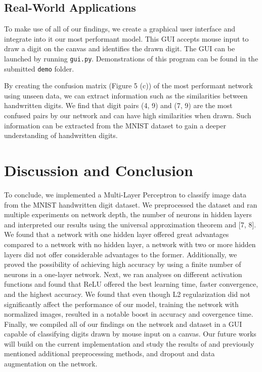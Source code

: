 \documentclass[10pt]{article}
\begin{document}
\subsection{Real-World Applications}

To make use of all of our findings, we create a graphical user interface and integrate into it our most performant model. This GUI accepts mouse input to draw a digit on the canvas and identifies the drawn digit. The GUI can be launched by running \verb+gui.py+. Demonstrations of this program can be found in the submitted \verb+demo+ folder.

By creating the confusion matrix (Figure 5 (c)) of the most performant network using unseen data, we can extract information such as the similarities between handwritten digits. We find that digit pairs (4, 9) and (7, 9) are the most confused pairs by our network and can have high similarities when drawn. Such information can be extracted from the MNIST dataset to gain a deeper understanding of handwritten digits.

\section{Discussion and Conclusion}
To conclude, we implemented a Multi-Layer Perceptron to classify image data from the MNIST handwritten digit dataset. We preprocessed the dataset and ran multiple experiments on network depth, the number of neurons in hidden layers and interpreted our results using the universal approximation theorem and [7, 8]. We found that a network with one hidden layer offered great advantages compared to a network with no hidden layer, a network with two or more hidden layers did not offer considerable advantages to the former. Additionally, we proved the possibility of achieving high accuracy by using a finite number of neurons in a one-layer network. Next, we ran analyses on different activation functions and found that ReLU offered the best learning time, faster convergence, and the highest accuracy. We found that even though L2 regularization did not significantly affect the performance of our model, training the network with normalized images, resulted in a notable boost in accuracy and covergence time. Finally, we compiled all of our findings on the network and dataset in a GUI capable of classifying digits drawn by mouse input on a canvas. Our future works will build on the current implementation and study the results of and previously mentioned additional preprocessing methods, and dropout and data augmentation on the network.\\
\end{document}
